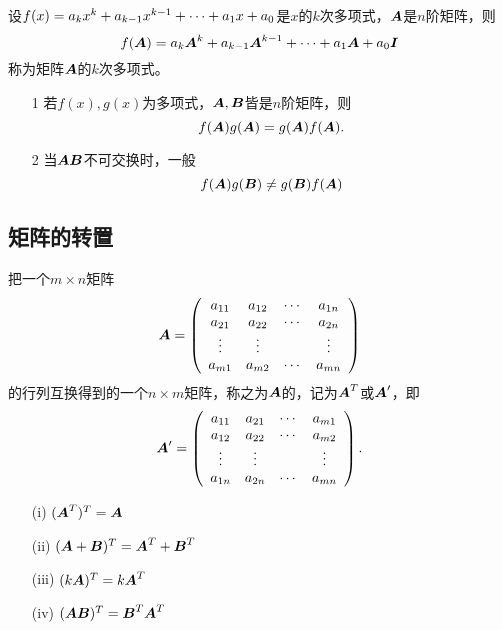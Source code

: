 \begin{frame}
\begin{dingyi}[矩阵多项式]
  设$f(x)=a_kx^k+a_{k-1}x^{k-1}+\cdots+a_1x+a_0$是$x$的$k$次多项式，$\boldsymbol{A}$是$n$阶矩阵，则
  $$
  f(\boldsymbol{A})=a_k\boldsymbol{A}^k+a_{k-1}\boldsymbol{A}^{k-1}+\cdots+a_1\boldsymbol{A}+a_0\boldsymbol{I}
  $$
  称为矩阵$\boldsymbol{A}$的$k$次多项式。
\end{dingyi}
% 
\begin{zhu*}
  \begin{itemize}
  \item[1] 若$f(x), g(x)$为多项式，$\boldsymbol{A},\boldsymbol{B}$皆是$n$阶矩阵，则
    $$
    f(\boldsymbol{A})g(\boldsymbol{A}) = g(\boldsymbol{A})f(\boldsymbol{A}).
    $$
  \item[2] 当$\boldsymbol{A}\boldsymbol{B}$不可交换时，一般
    $$f(\boldsymbol{A})g(\boldsymbol{B})\ne g(\boldsymbol{B})f(\boldsymbol{A})$$
  \end{itemize}
\end{zhu*}
\end{frame}

\subsection{矩阵的转置}

\begin{frame}
  \begin{dingyi}[转置矩阵]
  把一个$m\times n$矩阵
  $$
  \boldsymbol{A} = \left(
    \begin{array}{cccc}
      a_{11} & a_{12} & \cdots & a_{1n} \\
      a_{21} & a_{22} & \cdots & a_{2n} \\
      \vdots   & \vdots &  & \vdots \\
      a_{m1} & a_{m2} & \cdots & a_{mn} 
    \end{array}
  \right)
  $$
  的行列互换得到的一个$n\times m$矩阵，称之为$\boldsymbol{A}$的，记为$\boldsymbol{A}^T$或$\boldsymbol{A}^\prime$，即
  $$
  \boldsymbol{A}^\prime = \left(
    \begin{array}{cccc}
      a_{11} & a_{21} & \cdots & a_{m1} \\
      a_{12} & a_{22} & \cdots & a_{m2} \\
      \vdots   & \vdots &  & \vdots \\
      a_{1n} & a_{2n} & \cdots & a_{mn} 
    \end{array}
  \right).
  $$  
\end{dingyi}
\end{frame}

\begin{frame}
\begin{dingli}[矩阵转置的运算律]
  \begin{itemize}
  \item[(i)] $(\boldsymbol{A}^T)^T=\boldsymbol{A}$
  \item[(ii)] $(\boldsymbol{A}+\boldsymbol{B})^T=\boldsymbol{A}^T+\boldsymbol{B}^T$
  \item[(iii)] $(k\boldsymbol{A})^T= k\boldsymbol{A}^T$
  \item[(iv)] $(\boldsymbol{A}\boldsymbol{B})^T=\boldsymbol{B}^T\boldsymbol{A}^T$
  \end{itemize}
\end{dingli}
\end{frame}

